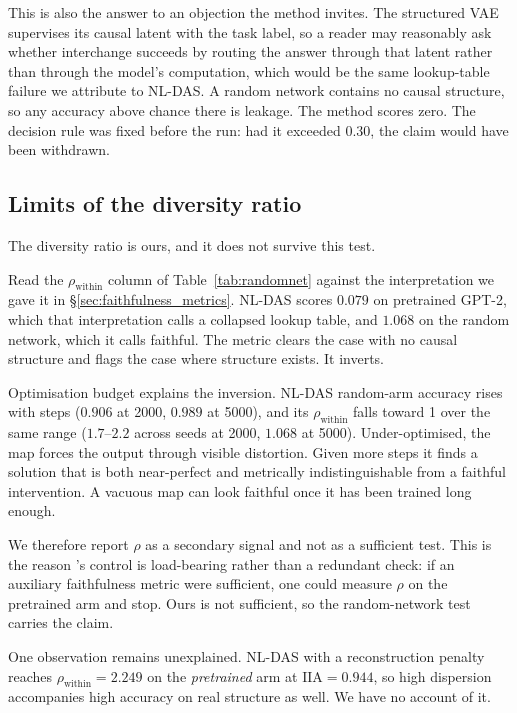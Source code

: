 \documentclass{article}
\newcommand{\IIA}{\mathrm{IIA}}
\begin{document}
This is also the answer to an objection the method invites. The structured VAE
supervises its causal latent with the task label, so a reader may reasonably ask
whether interchange succeeds by routing the answer through that latent rather
than through the model's computation, which would be the same lookup-table
failure we attribute to NL-DAS. A random network contains no causal structure, so
any accuracy above chance there is leakage. The method scores zero. The decision
rule was fixed before the run: had it exceeded $0.30$, the claim would have been
withdrawn.

\subsection{Limits of the diversity ratio}
\label{sec:rho_fails}

The diversity ratio is ours, and it does not survive this test.

Read the $\rho_\text{within}$ column of Table~\ref{tab:randomnet} against the
interpretation we gave it in \S\ref{sec:faithfulness_metrics}. NL-DAS scores $0.079$ on
pretrained GPT-2, which that interpretation calls a collapsed lookup table, and
$1.068$ on the random network, which it calls faithful. The metric clears the
case with no causal structure and flags the case where structure exists. It
inverts.

Optimisation budget explains the inversion. NL-DAS random-arm accuracy rises with
steps ($0.906$ at 2000, $0.989$ at 5000), and its $\rho_\text{within}$ falls
toward 1 over the same range ($1.7$--$2.2$ across seeds at 2000, $1.068$ at
5000). Under-optimised, the map forces the output through visible distortion.
Given more steps it finds a solution that is both near-perfect and metrically
indistinguishable from a faithful intervention. A vacuous map can look faithful
once it has been trained long enough.

We therefore report $\rho$ as a secondary signal and not as a sufficient test.
This is the reason \citeauthor{sutter2025nonlinear}'s control is load-bearing
rather than a redundant check: if an auxiliary faithfulness metric were
sufficient, one could measure $\rho$ on the pretrained arm and stop. Ours is not
sufficient, so the random-network test carries the claim.

One observation remains unexplained. NL-DAS with a reconstruction penalty reaches
$\rho_\text{within} = 2.249$ on the \emph{pretrained} arm at $\IIA = 0.944$, so
high dispersion accompanies high accuracy on real structure as well. We have no
account of it.
\end{document}
